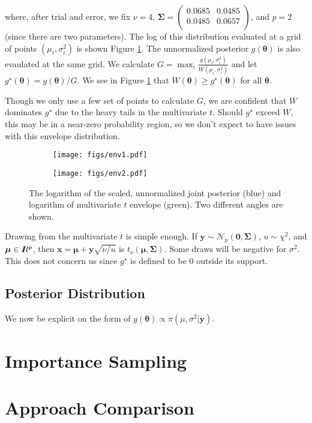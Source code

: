 \documentclass[12pt]{article}
\newcommand{\m}[1]{\mathbf{\bm{#1}}}
\newcommand{\R}{I\hspace{-4.4pt}R}
\begin{document}
\noindent where, after trial and error, we fix $\nu = 4$, $\m{\Sigma} = \left(\begin{array}{ll} 0.0685 & 0.0485 \\ 0.0485 & 0.0657 \\ \end{array}\right)$, and $p=2$ (since there are two parameters). The log of this distribution evaluated at a grid of points $(\mu_i, \sigma^2_i)$ is shown Figure \ref{envelope}. The unnormalized posterior $g(\m{\theta})$ is also evaulated at the same grid. We calculate $G=\max_i\frac{g(\mu_i,\sigma^2_i)}{W(\mu_i,\sigma^2_i)}$ and let $g^\star(\m{\theta}) = g(\m{\theta})/G$. We see in Figure \ref{envelope} that $W(\m{\theta})\geq g^\star(\m{\theta})$ for all $\m{\theta}$.
\bigskip

\noindent Though we only use a few set of points to calculate $G$, we are confident that $W$ dominates $g^\star$ due to the heavy tails in the multivariate $t$. Should $g^\star$ exceed $W$, this may be in a near-zero probability region, so we don't expect to have issues with this envelope distribution.
\bigskip

\begin{figure}
    \centering
    \begin{subfigure}{.5\textwidth}
        \centering
        \texttt{[image: figs/env1.pdf]}
    \end{subfigure}%
    \begin{subfigure}{.5\textwidth}
        \centering
        \texttt{[image: figs/env2.pdf]}
    \end{subfigure}
    \caption{The logarithm of the scaled, unnormalized joint posterior (blue) and logarithm of multivariate $t$ envelope (green). Two different angles are shown.}
    \label{envelope}
\end{figure}

\noindent Drawing from the multivariate $t$ is simple enough. If $\m{y}\sim\mathcal{N}_p(\m{0},\m{\Sigma})$, $u\sim\chi^2$, and $\m{\mu}\in\R^p$, then $\m{x}=\m{\mu}+\m{y}\sqrt{\nu/u}$ is $t_\nu(\m{\mu},\m{\Sigma})$. Some draws will be negative for $\sigma^2$. This does not concern us since $g^\star$ is defined to be $0$ outside its support.

\subsection{Posterior Distribution}

\noindent We now be explicit on the form of $g(\m{\theta}) \propto \pi(\mu,\sigma^2|\m{y})$.

\section{Importance Sampling}

\section{Approach Comparison}
\end{document}

